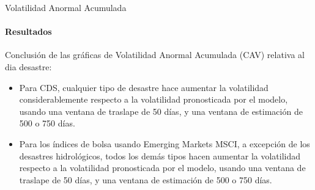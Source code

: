 \documentclass{beamer}
\begin{document}
\begin{frame}{Volatilidad Anormal Acumulada}
\framesubtitle{Resultados}
Conclusión de las gráficas de Volatilidad Anormal Acumulada (CAV) relativa al dia desastre:
\begin{itemize}
    \item Para CDS, cualquier tipo de desastre hace aumentar la volatilidad considerablemente respecto a la volatilidad pronosticada por el modelo, usando una ventana de traslape de 50 días, y una ventana de estimación de 500 o 750 días.
    \item Para los índices de bolsa usando Emerging Markets MSCI, a excepción de los desastres hidrológicos, todos los demás tipos hacen aumentar la volatilidad respecto a la volatilidad pronosticada por el modelo, usando una ventana de traslape de 50 días, y una ventana de estimación de 500 o 750 días.
\end{itemize}
\end{frame}
\end{document}
